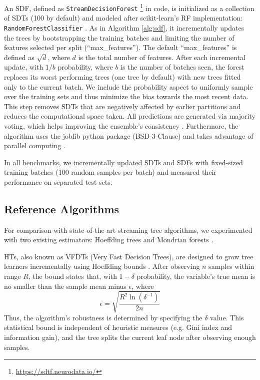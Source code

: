 An SDF, defined as \texttt{StreamDecisionForest} 
\footnote{\url{https://sdtf.neurodata.io/}}
in code, is initialized as a collection of SDTs (100 by default) and modeled after scikit-learn's RF implementation: \texttt{RandomForestClassifier} \citep{pedregosa_scikit-learn_2011}. As in Algorithm \ref{alg:sdf}, it incrementally updates the trees by bootstrapping the training batches and limiting the number of features selected per split (``max\_features''). The default ``max\_features'' is defined as $\sqrt{d}$, where $d$ is the total number of features. After each incremental update, with $1/b$ probability, where $b$ is the number of batches seen, the forest replaces its worst performing trees (one tree by default) with new trees fitted only to the current batch. We include the probability aspect to uniformly sample over the training sets and thus minimize the bias towards the most recent data. This step removes SDTs that are negatively affected by earlier partitions and reduces the computational space taken. All predictions are generated via majority voting, which helps improving the ensemble's consistency \citep{liaw_classification_2002, biau_consistency_2008, breiman_random_2001}. Furthermore, the algorithm uses the joblib python package (BSD-3-Clause) and takes advantage of parallel computing \citep{joblib_developers_joblibjoblib_2022}.

In all benchmarks, we incrementally updated SDTs and SDFs with fixed-sized training batches (100 random samples per batch) and measured their performance on separated test sets.

\subsection{Reference Algorithms}
For comparison with state-of-the-art streaming tree algorithms, we experimented with two existing estimators: Hoeffding trees and Mondrian forests \citep{domingos_mining_2000, lakshminarayanan_mondrian_2014, khannouz_benchmark_2020, pfahringer_new_2007, gomes_machine_2019, lakshminarayanan_mondrian_2016}. 

HTs, also known as VFDTs (Very Fast Decision Trees), are designed to grow tree learners incrementally using Hoeffding bounds \citep{domingos_mining_2000, hoeffding_probability_1994}. 
After observing $n$ samples within range $R$, the bound states that, with $1 - \delta$ probability, the variable's true mean is no smaller than the sample mean minus $\epsilon$, where 
\begin{equation*} \epsilon=\sqrt{\frac{R^2\ln(\delta^{-1})}{2n}} \tag{1} \end{equation*}
Thus, the algorithm's robustness is determined by specifying the $\delta$ value.
This statistical bound is independent of heuristic measures (e.g. Gini index and information gain), and the tree splits the current leaf node after observing enough samples.


